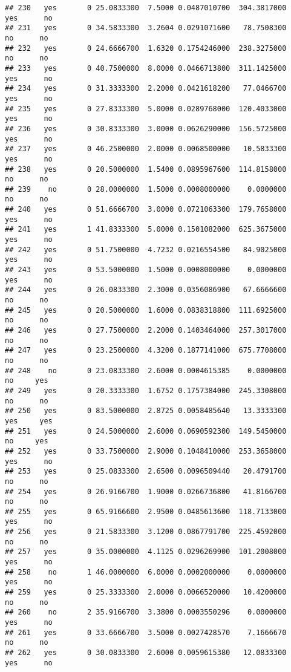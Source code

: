 \documentclass[]{article}
\begin{document}
\begin{verbatim}
## 230   yes       0 25.0833300  7.5000 0.0487010700  304.3817000   yes      no
## 231   yes       0 34.5833300  3.2604 0.0291071600   78.7508300    no      no
## 232   yes       0 24.6666700  1.6320 0.1754246000  238.3275000    no      no
## 233   yes       0 40.7500000  8.0000 0.0466713800  311.1425000   yes      no
## 234   yes       0 31.3333300  2.2000 0.0421618200   77.0466700   yes      no
## 235   yes       0 27.8333300  5.0000 0.0289768000  120.4033000   yes      no
## 236   yes       0 30.8333300  3.0000 0.0626290000  156.5725000   yes      no
## 237   yes       0 46.2500000  2.0000 0.0068500000   10.5833300   yes      no
## 238   yes       0 20.5000000  1.5400 0.0895967600  114.8158000    no      no
## 239    no       0 28.0000000  1.5000 0.0008000000    0.0000000    no      no
## 240   yes       0 51.6666700  3.0000 0.0721063300  179.7658000   yes      no
## 241   yes       1 41.8333300  5.0000 0.1501082000  625.3675000   yes      no
## 242   yes       0 51.7500000  4.7232 0.0216554500   84.9025000   yes      no
## 243   yes       0 53.5000000  1.5000 0.0008000000    0.0000000   yes      no
## 244   yes       0 26.0833300  2.3000 0.0356086900   67.6666600    no      no
## 245   yes       0 20.5000000  1.6000 0.0838318800  111.6925000    no      no
## 246   yes       0 27.7500000  2.2000 0.1403464000  257.3017000    no      no
## 247   yes       0 23.2500000  4.3200 0.1877141000  675.7708000    no      no
## 248    no       0 23.0833300  2.6000 0.0004615385    0.0000000    no     yes
## 249   yes       0 20.3333300  1.6752 0.1757384000  245.3308000    no      no
## 250   yes       0 83.5000000  2.8725 0.0058485640   13.3333300   yes     yes
## 251   yes       0 24.5000000  2.6000 0.0690592300  149.5450000    no     yes
## 252   yes       0 33.7500000  2.9000 0.1048410000  253.3658000   yes      no
## 253   yes       0 25.0833300  2.6500 0.0096509440   20.4791700    no      no
## 254   yes       0 26.9166700  1.9000 0.0266736800   41.8166700    no      no
## 255   yes       0 65.9166600  2.9500 0.0485613600  118.7133000   yes      no
## 256   yes       0 21.5833300  3.1200 0.0867791700  225.4592000    no      no
## 257   yes       0 35.0000000  4.1125 0.0296269900  101.2008000   yes      no
## 258    no       1 46.0000000  6.0000 0.0002000000    0.0000000   yes      no
## 259   yes       0 25.3333300  2.0000 0.0066520000   10.4200000    no      no
## 260    no       2 35.9166700  3.3800 0.0003550296    0.0000000   yes      no
## 261   yes       0 33.6666700  3.5000 0.0027428570    7.1666670    no      no
## 262   yes       0 30.0833300  2.6000 0.0059615380   12.0833300   yes      no

\end{verbatim}
\end{document}
